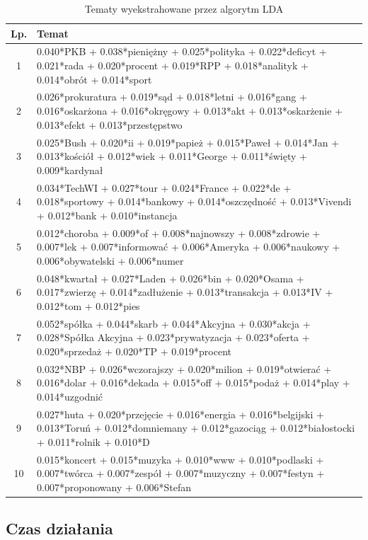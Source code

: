 \documentclass[11pt,a4paper]{article}
\begin{document}
\begin{table}[h]
\caption{Tematy wyekstrahowane przez algorytm LDA}
\label{lda_topics}
\begin{tabular}{|c|p{\linewidth}|}
\hline
Lp. & Temat \\\hline

1 & 0.040*PKB + 0.038*pieniężny + 0.025*polityka + 0.022*deficyt + 0.021*rada + 0.020*procent + 0.019*RPP + 0.018*analityk + 0.014*obrót + 0.014*sport\\\hline
2 & 0.026*prokuratura + 0.019*sąd + 0.018*letni + 0.016*gang + 0.016*oskarżona + 0.016*okręgowy + 0.013*akt + 0.013*oskarżenie + 0.013*efekt + 0.013*przestępstwo\\\hline
3 & 0.025*Bush + 0.020*ii + 0.019*papież + 0.015*Paweł + 0.014*Jan + 0.013*kościół + 0.012*wiek + 0.011*George + 0.011*święty + 0.009*kardynał\\\hline
4 & 0.034*TechWI + 0.027*tour + 0.024*France + 0.022*de + 0.018*sportowy + 0.014*bankowy + 0.014*oszczędność + 0.013*Vivendi + 0.012*bank + 0.010*instancja\\\hline
5 & 0.012*choroba + 0.009*of + 0.008*najnowszy + 0.008*zdrowie + 0.007*lek + 0.007*informować + 0.006*Ameryka + 0.006*naukowy + 0.006*obywatelski + 0.006*numer\\\hline
6 & 0.048*kwartał + 0.027*Laden + 0.026*bin + 0.020*Osama + 0.017*zwierzę + 0.014*zadłużenie + 0.013*transakcja + 0.013*IV + 0.012*tom + 0.012*pies\\\hline
7 & 0.052*spółka + 0.044*skarb + 0.044*Akcyjna + 0.030*akcja + 0.028*Spółka Akcyjna + 0.023*prywatyzacja + 0.023*oferta + 0.020*sprzedaż + 0.020*TP + 0.019*procent\\\hline
8 & 0.032*NBP + 0.026*wczorajszy + 0.020*milion + 0.019*otwierać + 0.016*dolar + 0.016*dekada + 0.015*off + 0.015*podaż + 0.014*play + 0.014*uzgodnić\\\hline
9 & 0.027*huta + 0.020*przejęcie + 0.016*energia + 0.016*belgijski + 0.013*Toruń + 0.012*domniemany + 0.012*gazociąg + 0.012*białostocki + 0.011*rolnik + 0.010*D\\\hline
10 & 0.015*koncert + 0.015*muzyka + 0.010*www + 0.010*podlaski + 0.007*twórca + 0.007*zespół + 0.007*muzyczny + 0.007*festyn + 0.007*proponowany + 0.006*Stefan\\\hline
\end{tabular}
\end{table}

\FloatBarrier

\subsection{Czas działania}
\end{document}
